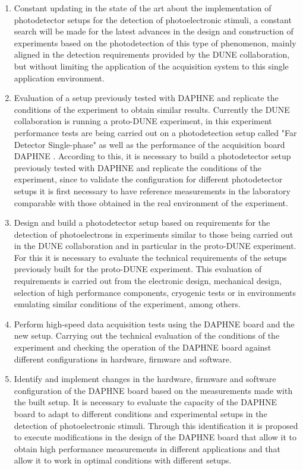 \documentclass[a4paper,10pt,epsfig,epsf,amsfonts,amsmath]{article}
\begin{document}
\begin{enumerate}
    \item Constant updating in the state of the art about the implementation of photodetector setups for the detection of photoelectronic stimuli, a constant search will be made for the latest advances in the design and construction of experiments based on the photodetection of this type of phenomenon, mainly aligned in the detection requirements provided by the DUNE collaboration, but without limiting the application of the acquisition system to this single application environment.
    
    \item Evaluation of a setup previously tested with DAPHNE and replicate the conditions of the experiment to obtain similar results. Currently the DUNE collaboration is running a proto-DUNE experiment, in this experiment performance tests are being carried out on a photodetection setup called "Far Detector Single-phase" as well as the performance of the acquisition board DAPHNE \cite{Abi_2020}. According to this, it is necessary to build a photodetector setup previously tested with DAPHNE and replicate the conditions of the experiment, since to validate the configuration for different photodetector setups it is first necessary to have reference measurements in the laboratory comparable with those obtained in the real environment of the experiment.
    
    \item Design and build a photodetector setup based on requirements for the detection of photoelectrons in experiments similar to those being carried out in the DUNE collaboration and in particular in the proto-DUNE experiment. For this it is necessary to evaluate the technical requirements of the setups previously built for the proto-DUNE experiment. This evaluation of requirements is carried out from the electronic design, mechanical design, selection of high performance components, cryogenic tests or in environments emulating similar conditions of the experiment, among others.
    
    \item Perform high-speed data acquisition tests using the DAPHNE board and the new setup. Carrying out the technical evaluation of the conditions of the experiment and checking the operation of the DAPHNE board against different configurations in hardware, firmware and software.
    
    \item Identify and implement changes in the hardware, firmware and software configuration of the DAPHNE board based on the measurements made with the built setup. It is necessary to evaluate the capacity of the DAPHNE board to adapt to different conditions and experimental setups in the detection of photoelectronic stimuli. Through this identification it is proposed to execute modifications in the design of the DAPHNE board that allow it to obtain high performance measurements in different applications and that allow it to work in optimal conditions with different setups.
    

\end{enumerate}
\end{document}
